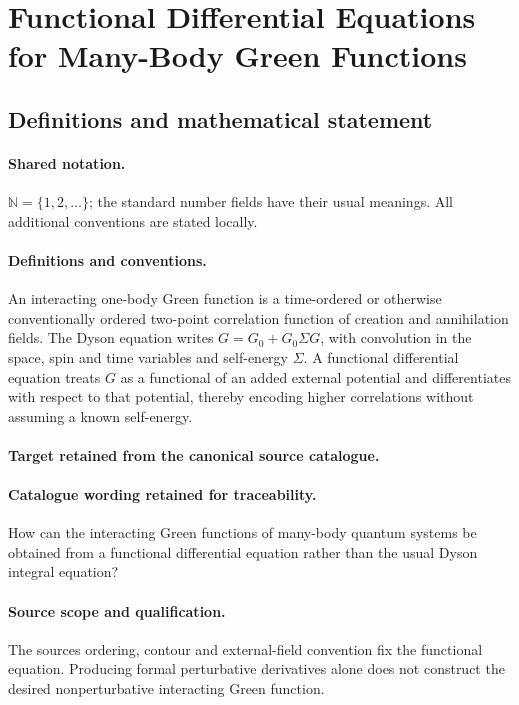 \documentclass[11pt]{article}
\begin{document}
\section{Functional Differential Equations for Many-Body Green Functions}\label{statement}

\subsection{Definitions and mathematical statement}

\paragraph{Shared notation.}$\mathbb N=\{1,2,\ldots\}$; the standard number fields have their usual meanings. All additional conventions are stated locally.


\paragraph{Definitions and conventions.}
An interacting one-body Green function is a time-ordered or otherwise conventionally ordered two-point correlation function of creation and annihilation fields. The Dyson equation writes $G=G_0+G_0\Sigma G$, with convolution in the space, spin and time variables and self-energy $\Sigma$. A functional differential equation treats $G$ as a functional of an added external potential and differentiates with respect to that potential, thereby encoding higher correlations without assuming a known self-energy.

\paragraph{Target retained from the canonical source catalogue.}
\paragraph{Catalogue wording retained for traceability.}
How can the interacting Green functions of many-body quantum systems be obtained from a functional differential equation rather than the usual Dyson integral equation?

\paragraph{Source scope and qualification.}
The source\textquotesingle s ordering, contour and external-field convention fix the functional equation. Producing formal perturbative derivatives alone does not construct the desired nonperturbative interacting Green function.
\end{document}
